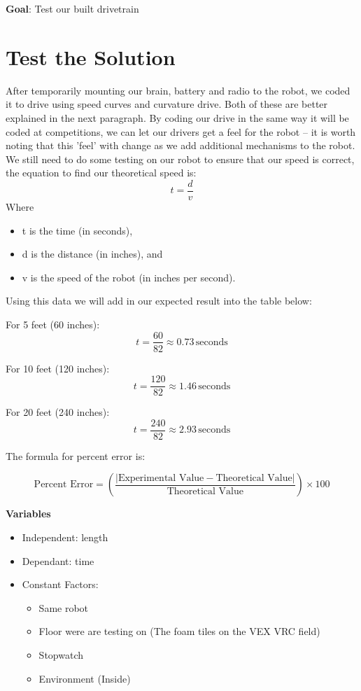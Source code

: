 \label{Test-the-Solution}
\textbf{Goal}: Test our built drivetrain
    \section*{Test the Solution}
After temporarily mounting our brain, battery and radio to the robot, we coded it to drive using speed curves and curvature drive. Both of these are better explained in the next paragraph. By coding our drive in the same way it will be coded at competitions, we can let our drivers get a feel for the robot -- it is worth noting that this 'feel' with change as we add additional mechanisms to the robot. We still need to do some testing on our robot to ensure that our speed is correct, the equation to find our theoretical speed is:
\[
t = \frac{d}{v}
\]
Where
\begin{itemize}
    \item t is the time (in seconds),
    \item d is the distance (in inches), and
    \item v is the speed of the robot (in inches per second).
\end{itemize}
Using this data we will add in our expected result into the table below:

For 5 feet (60 inches):
\[
t = \frac{60}{82} \approx 0.73 \, \text{seconds}
\]

For 10 feet (120 inches):
\[
t = \frac{120}{82} \approx 1.46 \, \text{seconds}
\]

For 20 feet (240 inches):
\[
t = \frac{240}{82} \approx 2.93 \, \text{seconds}
\]

The formula for percent error is:

\[
\text{Percent Error} = \left( \frac{|\text{Experimental Value} - \text{Theoretical Value}|}{\text{Theoretical Value}} \right) \times 100
\]

\textbf{Variables}
\begin{itemize}
    \item Independent: length
    \item Dependant: time
    \item Constant Factors: 
    \begin{itemize}
        \item Same robot
        \item Floor were are testing on (The foam tiles on the VEX VRC field)
        \item Stopwatch
        \item Environment (Inside)
    \end{itemize}
\end{itemize}


